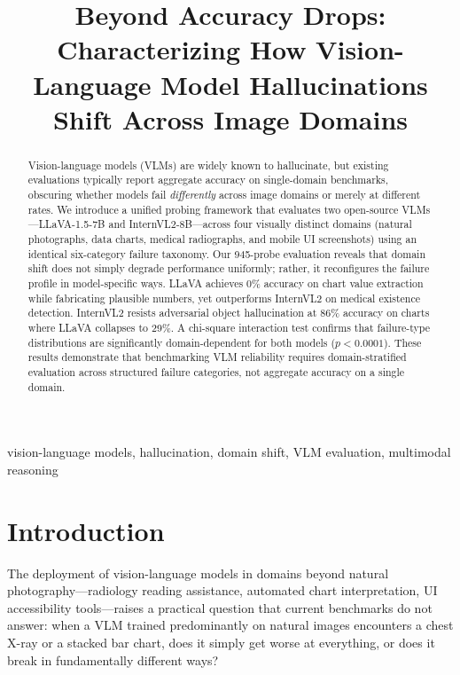 \documentclass[conference]{IEEEtran}
\begin{document}
\title{Beyond Accuracy Drops: Characterizing How Vision-Language Model Hallucinations Shift Across Image Domains}

\author{
}

\maketitle

\begin{abstract}
Vision-language models (VLMs) are widely known to hallucinate, but existing evaluations typically report aggregate accuracy on single-domain benchmarks, obscuring whether models fail \textit{differently} across image domains or merely at different rates. We introduce a unified probing framework that evaluates two open-source VLMs---LLaVA-1.5-7B and InternVL2-8B---across four visually distinct domains (natural photographs, data charts, medical radiographs, and mobile UI screenshots) using an identical six-category failure taxonomy. Our 945-probe evaluation reveals that domain shift does not simply degrade performance uniformly; rather, it reconfigures the failure profile in model-specific ways. LLaVA achieves 0\% accuracy on chart value extraction while fabricating plausible numbers, yet outperforms InternVL2 on medical existence detection. InternVL2 resists adversarial object hallucination at 86\% accuracy on charts where LLaVA collapses to 29\%. A chi-square interaction test confirms that failure-type distributions are significantly domain-dependent for both models ($p < 0.0001$). These results demonstrate that benchmarking VLM reliability requires domain-stratified evaluation across structured failure categories, not aggregate accuracy on a single domain.
\end{abstract}

\begin{IEEEkeywords}
vision-language models, hallucination, domain shift, VLM evaluation, multimodal reasoning
\end{IEEEkeywords}

\section{Introduction}

The deployment of vision-language models in domains beyond natural photography---radiology reading assistance, automated chart interpretation, UI accessibility tools---raises a practical question that current benchmarks do not answer: when a VLM trained predominantly on natural images encounters a chest X-ray or a stacked bar chart, does it simply get worse at everything, or does it break in fundamentally different ways?
\end{document}
